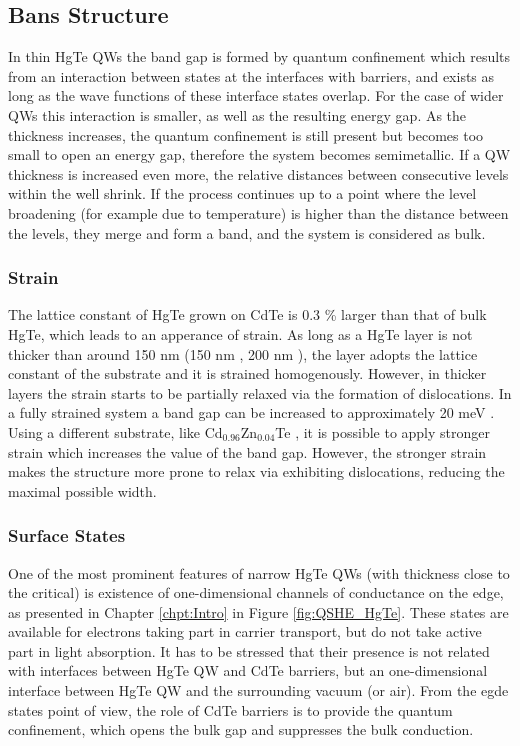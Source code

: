 \documentclass[titlepage,a4paper]{book}
\newcommand{\wciecie}{\quad\phantom{v}}
\begin{document}
\subsection{Bans Structure}
\wciecie
In thin HgTe QWs the band gap is formed by quantum confinement which results from an interaction between states at the interfaces with barriers, and exists as long as the wave functions of these interface states overlap. For the case of wider QWs this interaction is smaller, as well as the resulting energy gap. As the thickness increases, the quantum confinement is still present but becomes too small to open an energy gap, therefore the system becomes semimetallic. If a QW thickness is increased even more, the relative distances between consecutive levels within the well shrink. If the process continues up to a point where the level broadening (for example due to temperature) is higher than the distance between the levels, they merge and form a band, and the system is considered as bulk.

\subsubsection{Strain}
\wciecie
The lattice constant of HgTe grown on CdTe is 0.3 \% larger than that of bulk HgTe, which leads to an apperance of strain. As long as a HgTe layer is not thicker than around 150 nm (150 nm \cite{Crauste_StrainedMCT}, 200 nm \cite{Brune_State2}), the layer adopts the lattice constant of the substrate and it is strained homogenously. However, in thicker layers the strain starts to be partially relaxed via the formation of dislocations. In a fully strained system a band gap can be increased to approximately 20 meV \cite{Brune_State2}\cite{Crauste_StrainedMCT}. Using a different substrate, like Cd$_{0.96}$Zn$_{0.04}$Te \cite{Leubner_State}, it is possible to apply stronger strain which increases the value of the band gap. However, the stronger strain makes the structure more prone to relax via exhibiting dislocations, reducing the maximal possible width.

\subsubsection{Surface States}
\wciecie
One of the most prominent features of narrow HgTe QWs (with thickness close to the critical) is existence of one-dimensional channels of conductance on the edge, as presented in Chapter \ref{chpt:Intro} in Figure \ref{fig:QSHE_HgTe}. These states are available for electrons taking part in carrier transport, but do not take active part in light absorption. It has to be stressed that their presence is not related with interfaces between HgTe QW and CdTe barriers, but an one-dimensional interface between HgTe QW and the surrounding vacuum (or air). From the egde states point of view, the role of CdTe barriers is to provide the quantum confinement, which opens the bulk gap and suppresses the bulk conduction. 
\end{document}
